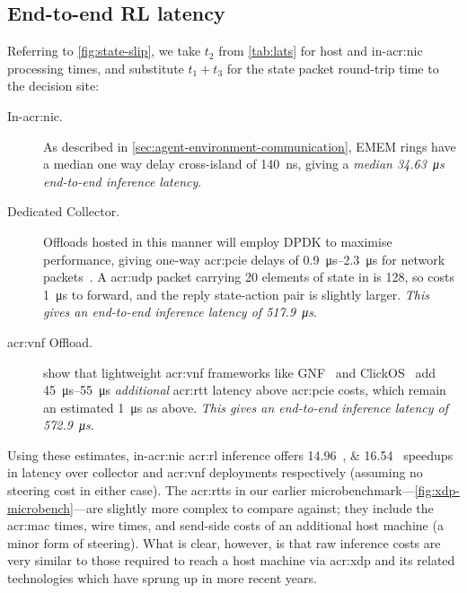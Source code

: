 \subsection{End-to-end RL latency}
Referring to \cref{fig:state-slip}, we take $t_2$ from \cref{tab:lats} for host and in-\gls{acr:nic} processing times, and substitute $t_1+t_3$ for the state packet round-trip time to the decision site:
\begin{description}
	\item[In-\gls{acr:nic}.] As described in \cref{sec:agent-environment-communication}, EMEM rings have a median one way delay cross-island of \qty{140}{\nano\second}, giving a \emph{median \qty{34.63}{\micro\second} end-to-end inference latency}.
	\item[Dedicated Collector.] Offloads hosted in this manner will employ DPDK to maximise performance, giving one-way \gls{acr:pcie} delays of \qtyrange{0.9}{2.3}{\micro\second} for network packets~\parencite{DBLP:conf/sigcomm/NeugebauerAZAL018}.
	A \gls{acr:udp} packet carrying \num{20} elements of state in \approachshort{} is \qty{128}{\byte}, so costs \qty{1}{\micro\second} to forward, and the reply state-action pair is slightly larger.
	\emph{This gives an end-to-end inference latency of \qty{517.9}{\micro\second}}.
	\item[\gls{acr:vnf} Offload.] \Textcite{DBLP:journals/cm/CzivaP17} show that  lightweight \gls{acr:vnf} frameworks like GNF~\parencite{DBLP:journals/cm/CzivaP17} and ClickOS~\parencite{DBLP:conf/nsdi/MartinsAROHBH14} add \qtyrange{45}{55}{\micro\second} \emph{additional} \gls{acr:rtt} latency above \gls{acr:pcie} costs, which remain an estimated \qty{1}{\micro\second} as above.
	\emph{This gives an end-to-end inference latency of \qty{572.9}{\micro\second}}.
\end{description}
Using these estimates, in-\gls{acr:nic} \gls{acr:rl} inference offers \qtylist{14.96;16.54}{\times} speedups in latency over collector and \gls{acr:vnf} deployments respectively (assuming no steering cost in either case).
The \glspl{acr:rtt} in our earlier microbenchmark---\cref{fig:xdp-microbench}---are slightly more complex to compare against; they include the \gls{acr:mac} times, wire times, and send-side costs of an additional host machine (a minor form of steering).
What is clear, however, is that raw \approachshort{} inference costs are very similar to those required to reach a host machine via \gls{acr:xdp} and its related technologies which have sprung up in more recent years.
